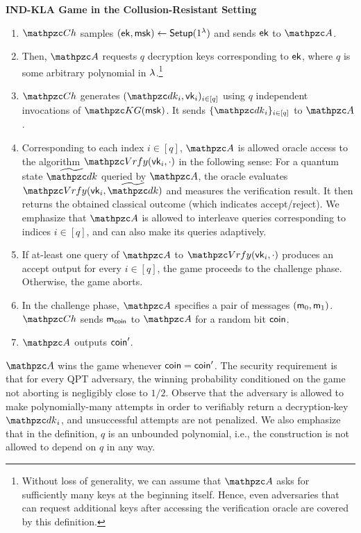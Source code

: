 \begin{description}
\item \textbf{IND-KLA Game in the Collusion-Resistant Setting}
\begin{enumerate}
\item $\qCh$ samples $(\mathsf{ek}, \mathsf{msk}) \leftarrow \mathsf{Setup}(1^\lambda)$ and sends
$\mathsf{ek}$ to $\qA$.
\item Then, $\qA$ requests $q$ decryption keys corresponding to $\mathsf{ek}$,
where $q$ is some arbitrary polynomial in $\lambda$.\footnote{Without loss of generality, we can assume that $\qA$ asks for sufficiently many keys at the beginning itself. Hence, even adversaries that can request additional keys after accessing the verification oracle are covered by this definition.}
\item $\qCh$ generates $(\qdk_i, \vk_i)_{i \in [q]}$ using $q$
independent
invocations of $\qKG(\msk)$. It sends $\{\qdk_i\}_{i\in[q]}$ to $\qA$.

\item Corresponding to each index $i \in [q]$, $\qA$ is allowed
oracle access to the algorithm $\qVrfy(\vk_i, \cdot)$ in the following
sense: For a quantum state $\widetilde{\qdk}$ queried by $\qA$, the
oracle evaluates $\qVrfy(\vk_i, \widetilde{\qdk})$ and measures the
verification result. It then returns the obtained classical outcome
(which indicates accept/reject). We emphasize that $\qA$ is allowed to
interleave queries corresponding to indices $i \in [q]$, and can also
make its queries adaptively.

\item If at-least one query of $\qA$ to $\qVrfy(\vk_i, \cdot)$
produces an accept output for every $i \in [q]$, the game proceeds to
the challenge phase. Otherwise, the game aborts.
\item In the challenge phase, $\qA$ specifies a pair of messages
$(\mathsf{m}_0, \mathsf{m}_1)$. $\qCh$ sends $\mathsf{m}_{\mathsf{coin}}$ to $\qA$ for a random
bit $\mathsf{coin}$.
\item $\qA$ outputs $\mathsf{coin}'$.
\end{enumerate}
\end{description}

$\qA$ wins the game whenever $\mathsf{coin} = \mathsf{coin}'$. The security
requirement is that for every QPT adversary, the winning probability
conditioned on the game not aborting is negligibly close to $1/2$.
Observe that the
adversary is allowed to make polynomially-many attempts in order to
verifiably return a decryption-key $\qdk_i$, and unsuccessful attempts
are not penalized.  We also emphasize that in the definition, $q$ is
an unbounded polynomial, i.e., the construction is not allowed to
depend on $q$ in any way.



